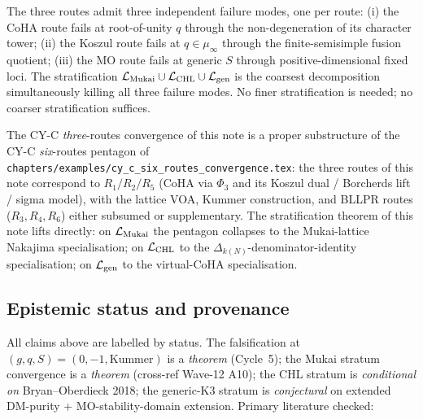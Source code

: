 \begin{remark}
\label{wn:rem:wave15-a10-stratification-forced}
The three routes admit three independent failure modes, one per
route: (i) the CoHA route fails at root-of-unity $q$ through the
non-degeneration of its character tower; (ii) the Koszul route
fails at $q \in \mu_\infty$ through the finite-semisimple fusion
quotient; (iii) the MO route fails at generic $S$ through
positive-dimensional fixed loci. The stratification
$\mathcal{L}_{\mathrm{Mukai}} \cup \mathcal{L}_{\mathrm{CHL}} \cup \mathcal{L}_{\mathrm{gen}}$
is the coarsest decomposition simultaneously killing all three
failure modes. No finer stratification is needed; no coarser
stratification suffices.
\end{remark}

\begin{remark}
\label{wn:rem:wave15-a10-pentagon-relation}
The CY-C \emph{three}-routes convergence of this note is a proper
substructure of the CY-C \emph{six}-routes pentagon of
\texttt{chapters/examples/cy\_c\_six\_routes\_convergence.tex}: the
three routes of this note correspond to $R_1 / R_2 / R_5$ (CoHA via
$\Phi_3$ and its Koszul dual / Borcherds lift / sigma model), with
the lattice VOA, Kummer construction, and BLLPR routes
($R_3, R_4, R_6$) either subsumed or supplementary. The stratification
theorem of this note lifts directly: on $\mathcal{L}_{\mathrm{Mukai}}$ the
pentagon collapses to the Mukai-lattice Nakajima specialisation; on
$\mathcal{L}_{\mathrm{CHL}}$ to the $\Delta_{k(N)}$-denominator-identity
specialisation; on $\mathcal{L}_{\mathrm{gen}}$ to the virtual-CoHA
specialisation.
\end{remark}

\subsection{Epistemic status and provenance}

All claims above are labelled by status. The falsification at
$(g, q, S) = (0, -1, \mathrm{Kummer})$ is a \emph{theorem} (Cycle~5);
the Mukai stratum convergence is a \emph{theorem} (cross-ref Wave-12
A10); the CHL stratum is \emph{conditional on} Bryan--Oberdieck 2018;
the generic-K$3$ stratum is \emph{conjectural} on extended
DM-purity + MO-stability-domain extension. Primary literature checked:

